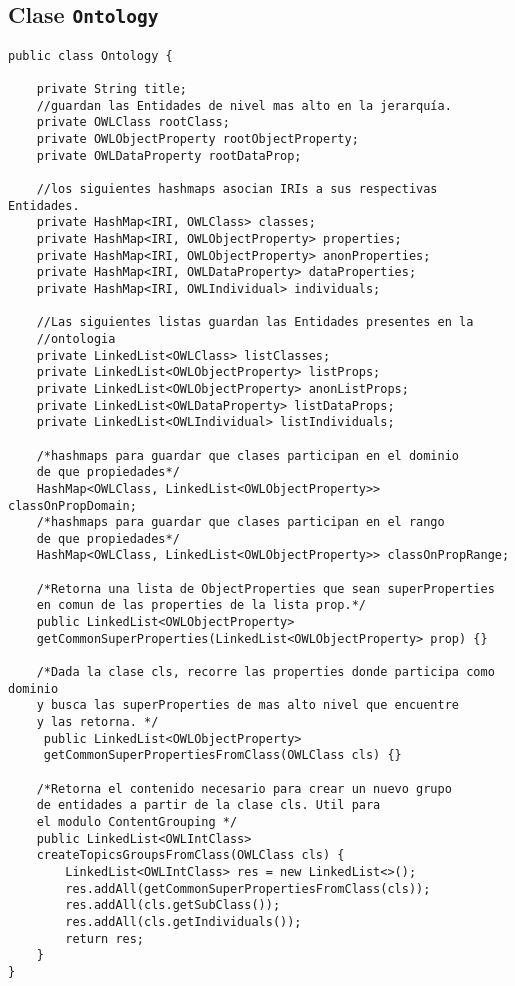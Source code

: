 \subsection{Clase \texttt{Ontology}}
\label{sec:clase_ontology}
\begin{verbatim}
public class Ontology {

    private String title;
    //guardan las Entidades de nivel mas alto en la jerarquía.
    private OWLClass rootClass;
    private OWLObjectProperty rootObjectProperty;
    private OWLDataProperty rootDataProp;

    //los siguientes hashmaps asocian IRIs a sus respectivas Entidades.
    private HashMap<IRI, OWLClass> classes;
    private HashMap<IRI, OWLObjectProperty> properties;
    private HashMap<IRI, OWLObjectProperty> anonProperties;
    private HashMap<IRI, OWLDataProperty> dataProperties;
    private HashMap<IRI, OWLIndividual> individuals;
    
    //Las siguientes listas guardan las Entidades presentes en la 
    //ontologia
    private LinkedList<OWLClass> listClasses;
    private LinkedList<OWLObjectProperty> listProps;
    private LinkedList<OWLObjectProperty> anonListProps;
    private LinkedList<OWLDataProperty> listDataProps;
    private LinkedList<OWLIndividual> listIndividuals;

    /*hashmaps para guardar que clases participan en el dominio
    de que propiedades*/
    HashMap<OWLClass, LinkedList<OWLObjectProperty>> classOnPropDomain;
    /*hashmaps para guardar que clases participan en el rango
    de que propiedades*/
    HashMap<OWLClass, LinkedList<OWLObjectProperty>> classOnPropRange;

    /*Retorna una lista de ObjectProperties que sean superProperties
    en comun de las properties de la lista prop.*/
    public LinkedList<OWLObjectProperty>
    getCommonSuperProperties(LinkedList<OWLObjectProperty> prop) {}

    /*Dada la clase cls, recorre las properties donde participa como dominio
    y busca las superProperties de mas alto nivel que encuentre 
    y las retorna. */
     public LinkedList<OWLObjectProperty>
     getCommonSuperPropertiesFromClass(OWLClass cls) {}

    /*Retorna el contenido necesario para crear un nuevo grupo
    de entidades a partir de la clase cls. Util para
    el modulo ContentGrouping */
    public LinkedList<OWLIntClass> 
    createTopicsGroupsFromClass(OWLClass cls) {
        LinkedList<OWLIntClass> res = new LinkedList<>();
        res.addAll(getCommonSuperPropertiesFromClass(cls));
        res.addAll(cls.getSubClass());
        res.addAll(cls.getIndividuals());
        return res;
    }
}
\end{verbatim}


